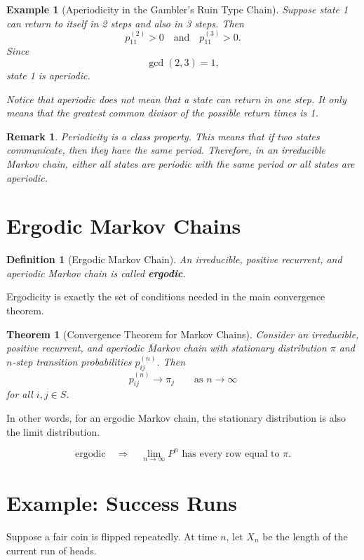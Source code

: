 \documentclass[12pt,a4paper]{article}
\theoremstyle{lecturestyle}
\newtheorem{definition}{Definition}
\newtheorem{example}{Example}
\newtheorem{theorem}{Theorem}
\newtheorem{remark}{Remark}
\begin{document}
\begin{example}[Aperiodicity in the Gambler's Ruin Type Chain]
Suppose state 1 can return to itself in 2 steps and also in 3 steps. Then
\[
p_{11}^{(2)}>0
\quad\text{and}\quad
p_{11}^{(3)}>0.
\]
Since
\[
\gcd(2,3)=1,
\]
state 1 is aperiodic.

Notice that aperiodic does not mean that a state can return in one step. It only means that the greatest common divisor of the possible return times is 1.
\end{example}

\begin{remark}
Periodicity is a class property. This means that if two states communicate, then they have the same period. Therefore, in an irreducible Markov chain, either all states are periodic with the same period or all states are aperiodic.
\end{remark}

\section{Ergodic Markov Chains}

\begin{definition}[Ergodic Markov Chain]
An irreducible, positive recurrent, and aperiodic Markov chain is called \textbf{ergodic}.
\end{definition}

Ergodicity is exactly the set of conditions needed in the main convergence theorem.

\begin{theorem}[Convergence Theorem for Markov Chains]
Consider an irreducible, positive recurrent, and aperiodic Markov chain with stationary distribution $\pi$ and $n$-step transition probabilities $p_{ij}^{(n)}$. Then
\[
p_{ij}^{(n)}\to \pi_j
\qquad\text{as }n\to\infty
\]
for all $i,j\in S$.
\end{theorem}

In other words, for an ergodic Markov chain, the stationary distribution is also the limit distribution.

\[
\boxed{\text{ergodic} \quad \Longrightarrow \quad \lim_{n\to\infty}P^n
\text{ has every row equal to }\pi.}
\]

\section{Example: Success Runs}

Suppose a fair coin is flipped repeatedly. At time $n$, let $X_n$ be the length of the current run of heads.
\end{document}
